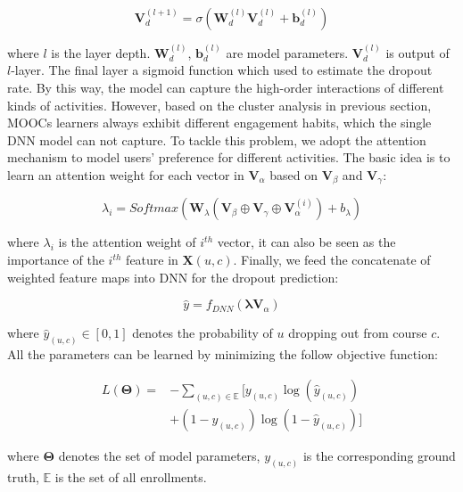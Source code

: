 \begin{equation}
\mathbf{V}_{d}^{(l+1)} = \sigma(\mathbf{W}_{d}^{(l)} \mathbf{V}_{d}^{(l)} + \mathbf{b}_{d}^{(l)} )
\end{equation}

\noindent where $l$ is the layer depth.  $\mathbf{W}_{d}^{(l)}$, $\mathbf{b}_{d}^{(l)}$ are model parameters. $\mathbf{V}_{d}^{(l)} $ is output of $l$-layer. The final layer a sigmoid function which used to estimate the dropout rate. By this way, the model can capture the high-order interactions of different kinds of activities. However, based on the cluster analysis in previous section, MOOCs learners always exhibit different engagement habits, which the single DNN model can not capture. To tackle this problem, we adopt the attention mechanism to model users' preference for different activities. The basic idea is to learn an attention weight for each vector in $\mathbf{V}_\alpha$ based on $\mathbf{V}_\beta$ and $\mathbf{V}_\gamma $: 

\begin{equation}
\lambda_i = Softmax(\mathbf{W}_\lambda(\mathbf{V}_\beta \oplus \mathbf{V}_\gamma \oplus  \mathbf{V}_\alpha^{(i)}) + b_\lambda)
\end{equation}

\noindent where $\lambda_i$ is the attention weight of $i^{th}$ vector, it can also be seen as the importance of the $i^{th}$ feature in $\mathbf{X}(u,c)$. Finally, we feed the concatenate of weighted feature maps into DNN for the dropout prediction:

\begin{equation}
\hat{y} = f_{DNN}(\mathbf{\lambda}\mathbf{V}_\alpha)
\end{equation}

\noindent where $\hat{y}_{(u,c)} \in [0,1]$ denotes the probability of $u$ dropping out from course $c$.
All the parameters can be learned by minimizing the follow objective function:

\begin{equation}
\begin{split}
L(\mathbf{\Theta}) =  &-\sum_{(u,c)\in \mathbb{E}} [y_{(u,c)}\log(\hat{y}_{(u,c)}) \\
             &+(1-y_{(u,c)})\log(1-\hat{y}_{(u,c)})]
\end{split}
\end{equation}

\noindent where $\mathbf{\Theta}$ denotes the set of model parameters, $y_{(u,c)}$ is the corresponding ground truth, $\mathbb{E}$ is the set of all enrollments.



